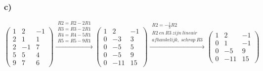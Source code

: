 \documentclass[11pt]{article}
\begin{document}
\subsubsection*{c)}
\[
\begin{pmatrix}
  1 & 2 & -1 \\
  2 & 1 & 1 \\
  2 & -1 & 7 \\
  5 & 5 & 4 \\
  9 & 7 & 6 
 \end{pmatrix}
 \overset{\begin{matrix}
  R2 = R2-2R1 \\
  R3 = R3-2R1 \\
  R4 = R4-5R1 \\
  R5 = R5-9R1
 \end{matrix}}{\rightarrow}
 \begin{pmatrix}
  1 & 2 & -1 \\
  0 & -3 & 3 \\
  0 & -5 & 5 \\
  0 & -5 & 9 \\
  0 & -11 & 15 
 \end{pmatrix}
 \overset{\begin{matrix}
  R2 = -\frac{1}{3}R2\\
  R2\:en\:R3\:zijn\:lineair\\afhankelijk,\;schrap\:R3
 \end{matrix}}{\rightarrow}
  \begin{pmatrix}
  1 & 2 & -1 \\
  0 & 1 & -1 \\
  0 & -5 & 9 \\
  0 & -11 & 15 
 \end{pmatrix}
\]
\end{document}
